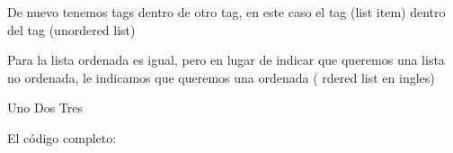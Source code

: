 \documentclass[letterpaper,10pt,spanish]{sphinxmanual}
\begin{document}
De nuevo tenemos tags dentro de otro tag, en este caso el tag  (list
item) dentro del tag  (unordered list)

Para la lista ordenada es igual, pero en lugar de indicar que queremos una lista
no ordenada, le indicamos que queremos una ordenada ( rdered  list en ingles)

%
\begin{sphinxVerbatim}[commandchars=\\\{\}]
        Uno
        Dos
        Tres
\end{sphinxVerbatim}

El código completo:
\end{document}
